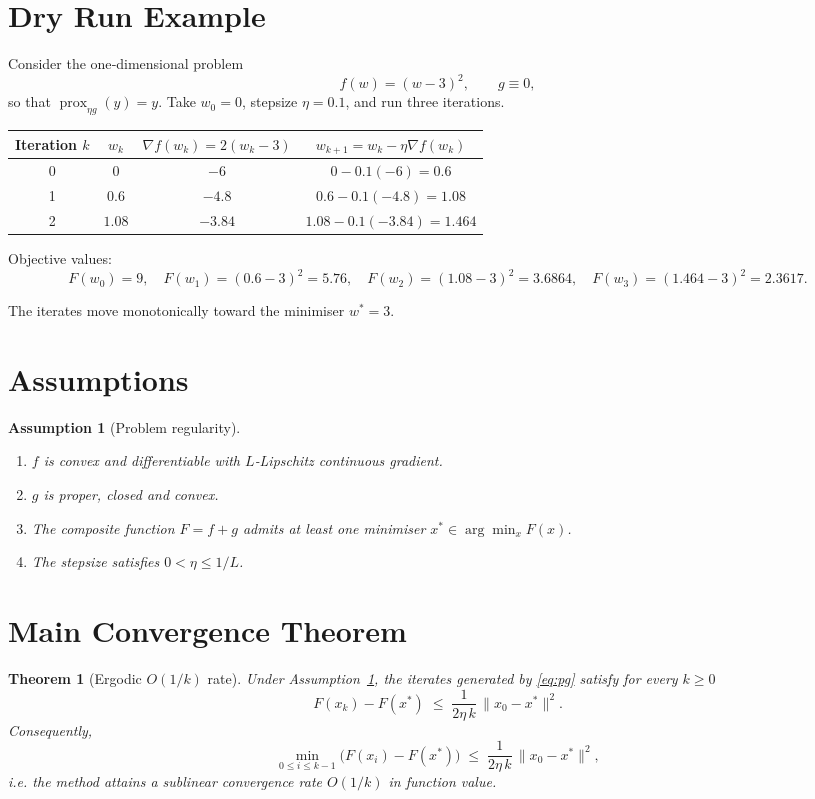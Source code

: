 \documentclass{article}
\newtheorem{theorem}{Theorem}
\newtheorem{assumption}{Assumption}
\newcommand{\prox}{\operatorname{prox}}
\begin{document}
\section*{Dry Run Example}
Consider the one‑dimensional problem
\[
f(w)=(w-3)^{2},\qquad g\equiv0,
\]
so that $\prox_{\eta g}(y)=y$.  
Take $w_{0}=0$, stepsize $\eta=0.1$, and run three iterations.

\begin{center}
\begin{tabular}{c|c|c|c}
Iteration $k$ & $w_{k}$ & $\nabla f(w_{k})=2(w_{k}-3)$ & $w_{k+1}=w_{k}-\eta\nabla f(w_{k})$\\\hline
0 & $0$   & $-6$ & $0-0.1(-6)=0.6$\\
1 & $0.6$ & $-4.8$ & $0.6-0.1(-4.8)=1.08$\\
2 & $1.08$& $-3.84$& $1.08-0.1(-3.84)=1.464$\\
\end{tabular}
\end{center}

Objective values:
\[
F(w_{0})=9,\quad F(w_{1})=(0.6-3)^{2}=5.76,\quad 
F(w_{2})=(1.08-3)^{2}=3.6864,\quad
F(w_{3})=(1.464-3)^{2}=2.3617.
\]

The iterates move monotonically toward the minimiser $w^{*}=3$.

\newpage

\section*{Assumptions}
\begin{assumption}[Problem regularity]\label{as:regular}
\begin{enumerate}
    \item $f$ is convex and differentiable with $L$‑Lipschitz continuous gradient.
    \item $g$ is proper, closed and convex.
    \item The composite function $F=f+g$ admits at least one minimiser $x^{*}\in\arg\min_{x}F(x)$.
    \item The stepsize satisfies $0<\eta\le 1/L$.
\end{enumerate}
\end{assumption}

\section*{Main Convergence Theorem}
\begin{theorem}[Ergodic $O(1/k)$ rate]\label{thm:rate}
Under Assumption~\ref{as:regular}, the iterates generated by \eqref{eq:pg} satisfy for every $k\ge 0$
\[
F(x_{k})-F(x^{*})\;\le\;\frac{1}{2\eta\,k}\,\|x_{0}-x^{*}\|^{2}.
\]
Consequently,
\[
\min_{0\le i\le k-1}\bigl(F(x_{i})-F(x^{*})\bigr)\;\le\;\frac{1}{2\eta\,k}\,\|x_{0}-x^{*}\|^{2},
\]
i.e. the method attains a sublinear convergence rate $O(1/k)$ in function value.
\end{theorem}
\end{document}
